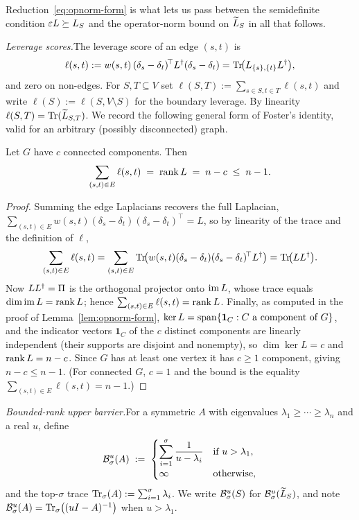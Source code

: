 Reduction~\eqref{eq:opnorm-form} is what lets us pass between the semidefinite
condition $\varepsilon L\succeq L_S$ and the operator-norm bound on $\widetilde{L}_S$ in all
that follows.

\medskip
\noindent\emph{Leverage scores.}\quad The leverage score of an edge $(s,t)$ is
\[
  \ell(s,t)
   := w(s,t)\,(\delta_s-\delta_t)^{\!\top}L^{\dagger}(\delta_s-\delta_t)
    = \operatorname{Tr}\!\bigl(L_{\{s\},\{t\}}L^{\dagger}\bigr),
\]
and zero on non-edges. For $S,T\subseteq V$ set
$\ell(S,T):=\sum_{s\in S,t\in T}\ell(s,t)$ and write
$\ell(S):=\ell(S,V\setminus S)$ for the boundary leverage. By linearity
$\ell(S,T)=\operatorname{Tr}(\widetilde{L}_{S,T})$. We record the following general form of
Foster's identity, valid for an arbitrary (possibly disconnected) graph.

\begin{qsixproposition}\label{prop:foster}
Let $G$ have $c$ connected components. Then
\[
  \sum_{(s,t)\in E}\ell(s,t)\;=\;\operatorname{rank} L\;=\;n-c\;\le\;n-1 .
\]
\end{qsixproposition}

\begin{proof}
Summing the edge Laplacians recovers the full Laplacian,
$\sum_{(s,t)\in E}w(s,t)(\delta_s-\delta_t)(\delta_s-\delta_t)^{\!\top}=L$, so by
linearity of the trace and the definition of $\ell$,
\[
  \sum_{(s,t)\in E}\ell(s,t)
   =\sum_{(s,t)\in E}\operatorname{Tr}\!\bigl(w(s,t)(\delta_s-\delta_t)(\delta_s-\delta_t)^{\!\top}L^{\dagger}\bigr)
   =\operatorname{Tr}\!\bigl(LL^{\dagger}\bigr).
\]
Now $LL^{\dagger}=\Pi$ is the orthogonal projector onto $\operatorname{im} L$, whose trace equals
$\dim\operatorname{im} L=\operatorname{rank} L$; hence $\sum_{(s,t)\in E}\ell(s,t)=\operatorname{rank} L$.
Finally, as computed in the proof of Lemma~\ref{lem:opnorm-form},
$\ker L=\operatorname{span}\{\mathbf 1_C:C\text{ a component of }G\}$, and the indicator
vectors $\mathbf 1_C$ of the $c$ distinct components are linearly independent
(their supports are disjoint and nonempty), so $\dim\ker L=c$ and
$\operatorname{rank} L=n-c$. Since $G$ has at least one vertex it has $c\ge 1$ component,
giving $n-c\le n-1$. (For connected $G$, $c=1$ and the bound is the equality
$\sum_{(s,t)\in E}\ell(s,t)=n-1$.)
\end{proof}

\medskip
\noindent\emph{Bounded-rank upper barrier.}\quad For a symmetric $A$ with
eigenvalues $\lambda_1\ge\cdots\ge\lambda_n$ and a real $u$, define
\[
  \mathcal{B}^{u}_{\sigma}(A) \;:=\;
  \begin{cases}
    \displaystyle\sum_{i=1}^{\sigma}\dfrac{1}{u-\lambda_i} & \text{if } u>\lambda_1,\\[2pt]
    \infty & \text{otherwise,}
  \end{cases}
\]
and the top-$\sigma$ trace $\operatorname{Tr}_{\sigma}(A):=\sum_{i=1}^{\sigma}\lambda_i$. We write
$\mathcal{B}^{u}_{\sigma}(S)$ for $\mathcal{B}^{u}_{\sigma}(\widetilde{L}_S)$, and note
$\mathcal{B}^{u}_{\sigma}(A)=\operatorname{Tr}_{\sigma}\bigl((uI-A)^{-1}\bigr)$ when $u>\lambda_1$.

